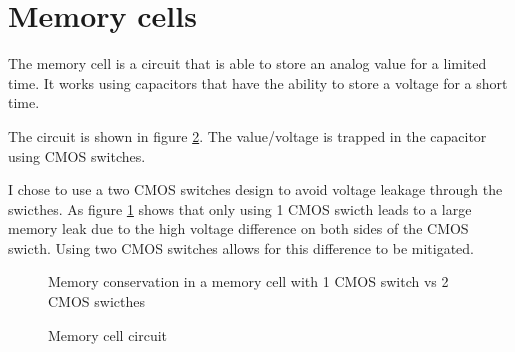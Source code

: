 \section{Memory cells}
\label{sec:memcell}

The memory cell is a circuit that is able to store an analog value for a limited time. It works using capacitors that have the ability to store a voltage for a short time.

The circuit is shown in figure \ref{fig:memcellCircuit}. The value/voltage is trapped in the capacitor using CMOS switches.


I chose to use a two CMOS switches design to avoid voltage leakage through the swicthes. As figure \ref{fig:memcellLoss} shows that only using 1 CMOS swicth leads to a large memory leak due to the high voltage difference on both sides of the CMOS swicth. Using two CMOS switches allows for this difference to be mitigated.

\begin{figure}[H]
  \centering
  
  \caption{Memory conservation in a memory cell with 1 CMOS switch vs 2 CMOS swicthes}
  \label{fig:memcellLoss}
\end{figure}


\begin{figure}[H]
  \centering
  
  \caption{Memory cell circuit}
  \label{fig:memcellCircuit}
\end{figure}
